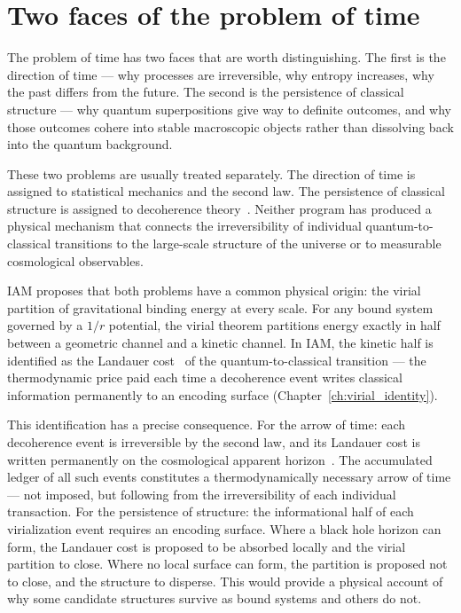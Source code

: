 \section{Two faces of the problem of time}\label{sec:vd_intro}
The problem of time has two faces that are worth distinguishing. The first is the direction of time --- why processes are irreversible, why entropy
increases, why the past differs from the future. The second is the persistence of classical structure --- why quantum superpositions give way to definite
outcomes, and why those outcomes cohere into stable macroscopic objects rather than dissolving back into the quantum background.

These two problems are usually treated separately. The direction of time is assigned to statistical mechanics and the second law. The persistence of
classical structure is assigned to decoherence theory~\cite{Zurek2003}. Neither program has produced a physical mechanism that connects the irreversibility
of individual quantum-to-classical transitions to the large-scale structure of the universe or to measurable cosmological observables.

IAM proposes that both problems have a common physical origin: the virial partition of gravitational binding energy at every scale. For any bound system
governed by a $1/r$ potential, the virial theorem partitions energy exactly in half between a geometric channel and a kinetic channel. In IAM, the kinetic half
is identified as the Landauer cost~\cite{Landauer1961} of the quantum-to-classical transition --- the thermodynamic price paid each time a decoherence event
writes classical information permanently to an encoding surface (Chapter~\ref{ch:virial_identity}).

This identification has a precise consequence. For the arrow of time: each decoherence event is irreversible by the second law, and its Landauer cost is
written permanently on the cosmological apparent horizon~\cite{Jacobson1995,CaiKim2005,GibbonsHawking1977}. The accumulated ledger of all such events
constitutes a thermodynamically necessary arrow of time --- not imposed, but following from the irreversibility of each individual transaction. For the
persistence of structure: the informational half of each virialization event requires an encoding surface. Where a black hole horizon can form, the Landauer
cost is proposed to be absorbed locally and the virial partition to close. Where no local surface can form, the partition is proposed not to close, and the
structure to disperse. This would provide a physical account of why some candidate structures survive as bound systems and others do not. \conjecture

